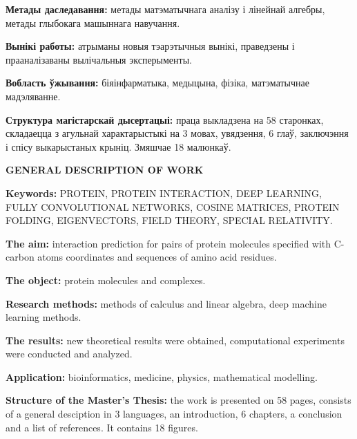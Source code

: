 \textbf{Метады даследавання:} метады матэматычнага аналізу і лінейнай алгебры, метады глыбокага машыннага навучання.

\textbf{Вынікі работы:} атрыманы новыя тэарэтычныя вынікі, праведзены і прааналізаваны вылічальныя эксперыменты.

\textbf{Вобласть ўжывання:} біяінфарматыка, медыцына, фізіка, матэматычнае мадэляванне.

\textbf{Структура магістарскай дысертацыі:} праца выкладзена на 58 старонках, складаецца з агульнай характарыстыкі на 3 мовах, увядзення, 6 глаў, заключэння і спісу выкарыстаных крыніц. Змяшчае 18 малюнкаў.

\newpage
{}
\begin{center}
	\textbf{\large GENERAL DESCRIPTION OF WORK}
\end{center}

\textbf{Keywords:} PROTEIN, PROTEIN INTERACTION, DEEP LEARNING, FULLY CONVOLUTIONAL NETWORKS, COSINE MATRICES, PROTEIN FOLDING, EIGENVECTORS, FIELD THEORY, SPECIAL RELATIVITY.

\textbf{The aim:} interaction prediction for pairs of protein molecules specified with C\textalpha-carbon atoms coordinates and sequences of amino acid residues.

\textbf{The object:} protein molecules and complexes.

\textbf{Research methods:} methods of calculus and linear algebra, deep machine learning methods.

\textbf{The results:} new theoretical results were obtained, computational experiments were conducted and analyzed.

\textbf{Application:} bioinformatics, medicine, physics, mathematical modelling.

\textbf{Structure of the Master's Thesis:} the work is presented on 58 pages, consists of a general desciption in 3 languages, an introduction, 6 chapters, a conclusion and a list of references. It contains 18 figures.
